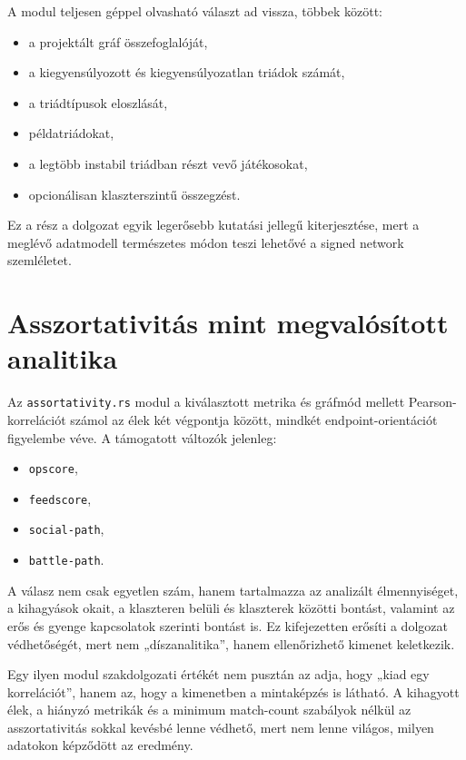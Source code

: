 \documentclass[a4paper,12pt]{report}
\begin{document}
A modul teljesen géppel olvasható választ ad vissza, többek között:

\begin{itemize}
    \item a projektált gráf összefoglalóját,
    \item a kiegyensúlyozott és kiegyensúlyozatlan triádok számát,
    \item a triádtípusok eloszlását,
    \item példatriádokat,
    \item a legtöbb instabil triádban részt vevő játékosokat,
    \item opcionálisan klaszterszintű összegzést.
\end{itemize}

Ez a rész a dolgozat egyik legerősebb kutatási jellegű kiterjesztése, mert a meglévő adatmodell természetes módon teszi lehetővé a signed network szemléletet.

\section{Asszortativitás mint megvalósított analitika}

Az \texttt{assortativity.rs} modul a kiválasztott metrika és gráfmód mellett Pearson-korrelációt számol az élek két végpontja között, mindkét endpoint-orientációt figyelembe véve. A támogatott változók jelenleg:

\begin{itemize}
    \item \texttt{opscore},
    \item \texttt{feedscore},
    \item \texttt{social-path},
    \item \texttt{battle-path}.
\end{itemize}

A válasz nem csak egyetlen szám, hanem tartalmazza az analizált élmennyiséget, a kihagyások okait, a klaszteren belüli és klaszterek közötti bontást, valamint az erős és gyenge kapcsolatok szerinti bontást is. Ez kifejezetten erősíti a dolgozat védhetőségét, mert nem „díszanalitika”, hanem ellenőrizhető kimenet keletkezik.

Egy ilyen modul szakdolgozati értékét nem pusztán az adja, hogy „kiad egy korrelációt”, hanem az, hogy a kimenetben a mintaképzés is látható. A kihagyott élek, a hiányzó metrikák és a minimum match-count szabályok nélkül az asszortativitás sokkal kevésbé lenne védhető, mert nem lenne világos, milyen adatokon képződött az eredmény.
\end{document}
